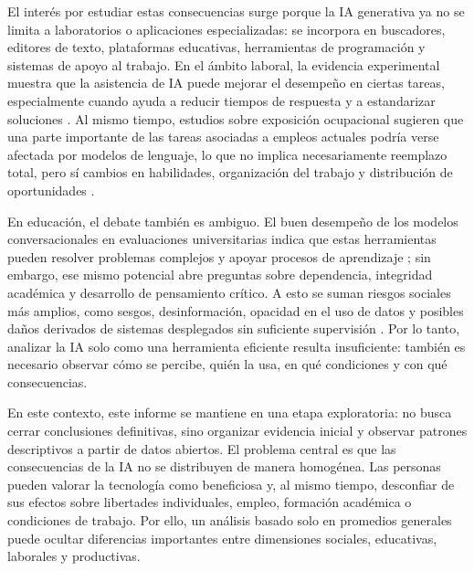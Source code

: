 \documentclass{llncs}
\begin{document}
El interés por estudiar estas consecuencias surge porque la IA generativa ya no se limita a laboratorios o aplicaciones especializadas: se incorpora en buscadores, editores de texto, plataformas educativas, herramientas de programación y sistemas de apoyo al trabajo. En el ámbito laboral, la evidencia experimental muestra que la asistencia de IA puede mejorar el desempeño en ciertas tareas, especialmente cuando ayuda a reducir tiempos de respuesta y a estandarizar soluciones \cite{brynjolfsson2023}. Al mismo tiempo, estudios sobre exposición ocupacional sugieren que una parte importante de las tareas asociadas a empleos actuales podría verse afectada por modelos de lenguaje, lo que no implica necesariamente reemplazo total, pero sí cambios en habilidades, organización del trabajo y distribución de oportunidades \cite{eloundou2023,wef2023}.

En educación, el debate también es ambiguo. El buen desempeño de los modelos conversacionales en evaluaciones universitarias indica que estas herramientas pueden resolver problemas complejos y apoyar procesos de aprendizaje \cite{geerling2023}; sin embargo, ese mismo potencial abre preguntas sobre dependencia, integridad académica y desarrollo de pensamiento crítico. A esto se suman riesgos sociales más amplios, como sesgos, desinformación, opacidad en el uso de datos y posibles daños derivados de sistemas desplegados sin suficiente supervisión \cite{weidinger2021}. Por lo tanto, analizar la IA solo como una herramienta eficiente resulta insuficiente: también es necesario observar cómo se percibe, quién la usa, en qué condiciones y con qué consecuencias.

En este contexto, este informe se mantiene en una etapa exploratoria: no busca cerrar conclusiones definitivas, sino organizar evidencia inicial y observar patrones descriptivos a partir de datos abiertos. El problema central es que las consecuencias de la IA no se distribuyen de manera homogénea. Las personas pueden valorar la tecnología como beneficiosa y, al mismo tiempo, desconfiar de sus efectos sobre libertades individuales, empleo, formación académica o condiciones de trabajo. Por ello, un análisis basado solo en promedios generales puede ocultar diferencias importantes entre dimensiones sociales, educativas, laborales y productivas.
\end{document}
